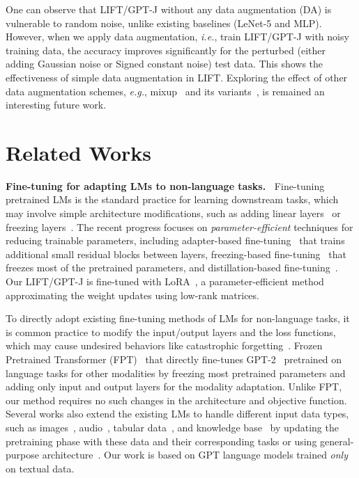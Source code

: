 One can observe that \textsc{LIFT}/GPT-J without any data augmentation (DA) is vulnerable to random noise, unlike existing baselines (LeNet-5 and MLP). However, when we apply data augmentation, \textit{i.e.}, train \textsc{LIFT}/GPT-J with noisy training data, the accuracy improves significantly for the perturbed (either adding Gaussian noise or Signed constant noise) test data. This shows the effectiveness of simple data augmentation in \textsc{LIFT}. Exploring the effect of other data augmentation schemes, \textit{e.g.}, mixup~\cite{zhang2017mixup} and its variants~\cite{yun2019cutmix,kim2020puzzle,sohn2022genlabel}, is remained an interesting future work.

\section{Related Works}
\textbf{Fine-tuning for adapting LMs to non-language tasks.~} Fine-tuning~\citep{li2017learning} pretrained LMs is the standard practice for learning downstream tasks, which may involve simple architecture modifications, such as adding linear layers~\citep{donahue2016adversarial,chen2020simple} or freezing layers~\citep{lu2021pretrained,perez2018film,chen2018self}. The recent progress focuses on \emph{parameter-efficient} techniques for reducing trainable parameters, including adapter-based fine-tuning~\citep{houlsby2019parameter,rebuffi2017learning,wang2020k} that trains additional small residual blocks between layers, freezing-based fine-tuning~\citep{gheini2021cross,lu2021pretrained,dinh2022improved} that freezes most of the pretrained parameters, and distillation-based fine-tuning~\citep{chen2019distilling}. Our \textsc{LIFT}/GPT-J is fine-tuned with LoRA~\citep{hu2021lora}, a parameter-efficient method approximating the weight updates using low-rank matrices.

To directly adopt existing fine-tuning methods of LMs for non-language tasks, it is common practice to modify the input/output layers and the loss functions, which may cause undesired behaviors like catastrophic forgetting~\citep{li2017learning,chen2020recall}. 
 Frozen Pretrained Transformer (FPT)~\citep{lu2021pretrained} that directly fine-tunes GPT-2~\citep{radford2019language} pretrained on language tasks for other modalities by freezing most pretrained parameters and adding only input and output layers for the modality adaptation. Unlike FPT, our method requires no such changes in the architecture and objective function. Several works also extend the existing LMs to handle different input data types, such as images~\citep{lu2019vilbert,tsimpoukelli2021multimodal}, audio~\citep{chuang2019speechbert}, tabular data~\citep{liu2021tapex}, and knowledge base~\citep{agarwal2020knowledge} by updating the pretraining phase with these data and their corresponding tasks or using general-purpose architecture~\citep{jaegle2021perceiver}. Our work is based on GPT language models trained \emph{only} on textual data.

